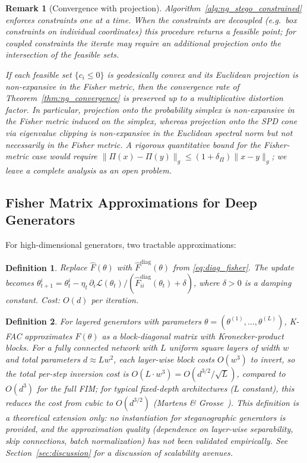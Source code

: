 \documentclass[a4paper,fleqn]{cas-dc}
\newtheorem{definition}{Definition}
\newtheorem{remark}{Remark}
\begin{document}
\begin{remark}[Convergence with projection]
  Algorithm~\ref{alg:ng_stego_constrained} enforces constraints one at a
  time.  When the constraints are decoupled (e.g.\ box constraints on
  individual coordinates) this procedure returns a feasible point; for
  coupled constraints the iterate may require an additional projection
  onto the intersection of the feasible sets.

  If each feasible set $\{c_i \leq 0\}$ is geodesically convex and its
  Euclidean projection is non-expansive in the Fisher metric, then the
  convergence rate of Theorem~\ref{thm:ng_convergence} is preserved up to
  a multiplicative distortion factor.  In particular, projection onto
  the probability simplex is non-expansive in the Fisher metric induced
  on the simplex, whereas projection onto the SPD cone via eigenvalue
  clipping is non-expansive in the Euclidean spectral norm but not
  necessarily in the Fisher metric.  A rigorous quantitative bound for
  the Fisher-metric case would require
  $\|\Pi(x)-\Pi(y)\|_g \leq (1+\delta_\Pi)\|x-y\|_g$; we leave a complete
  analysis as an open problem.
\end{remark}

\subsection{Fisher Matrix Approximations for Deep Generators}

For high-dimensional generators, two tractable approximations:

\begin{definition}%
  \label{def:diagonal_ng}
  Replace $\hat F(\theta)$ with $\hat F^{\mathrm{diag}}(\theta)$ from
  \eqref{eq:diag_fisher}.  The update becomes
  $\theta_{t+1}^i = \theta_t^i - \eta_t\,\partial_i\mathcal{L}(\theta_t) /
  (\hat F^{\mathrm{diag}}_{ii}(\theta_t) + \delta)$,
  where $\delta>0$ is a damping constant.  Cost: $O(d)$ per iteration.
\end{definition}

\begin{definition}%
  \label{def:kfac_ng}
  For layered generators with parameters $\theta = (\theta^{(1)},\ldots,\theta^{(L)})$,
  K-FAC approximates $F(\theta)$ as a block-diagonal matrix with
  Kronecker-product blocks.  For a fully connected network with $L$ uniform
  square layers of width $w$ and total parameters $d \approx L w^2$, each
  layer-wise block costs $O(w^3)$ to invert, so the total per-step inversion
  cost is $O(L\cdot w^3) = O(d^{3/2}/\sqrt{L})$, compared to $O(d^3)$ for the
  full FIM; for typical fixed-depth architectures ($L$ constant), this reduces
  the cost from cubic to $O(d^{3/2})$ (Martens \&
  Grosse~\cite{martens2015optimizing}).
  \emph{This definition is a theoretical extension only:}
  no instantiation for steganographic generators is provided, and the
  approximation quality (dependence on layer-wise separability, skip
  connections, batch normalization) has not been validated empirically.
  See Section~\ref{sec:discussion} for a discussion of scalability
  avenues.
\end{definition}
\end{document}
